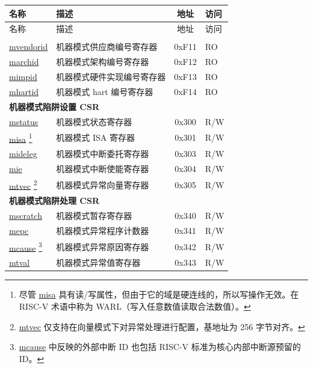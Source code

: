 
\begin{longtable}{ | p{4.0cm} | p{8.4cm} | c | l | }
\hline\rowcolor{lightgray}
名称 & 描述 & 地址 & 访问 \\ \hline
\endfirsthead
\hline
\rowcolor{lightgray}
名称 & 描述 & 地址 & 访问 \\
\hline
\endhead
\endfoot

\multicolumn{4}{|l|}{\textbf{机器模式信息 CSR}} \\\hline
\hyperref[regdesc:MVENDORID]{mvendorid} & 机器模式供应商编号寄存器 & 0xF11 & RO \\\hline
\hyperref[regdesc:MARCHID]{marchid} & 机器模式架构编号寄存器 & 0xF12 & RO \\\hline
\hyperref[regdesc:MIMPID]{mimpid} & 机器模式硬件实现编号寄存器 & 0xF13 & RO \\\hline
\hyperref[regdesc:MHARTID]{mhartid} & 机器模式 hart 编号寄存器 & 0xF14 & RO \\\hline
\multicolumn{4}{|l|}{\textbf{机器模式陷阱设置 CSR}} \\\hline
\hyperref[regdesc:MSTATUS]{mstatus} & 机器模式状态寄存器 & 0x300 & R/W \\\hline
\hyperref[regdesc:MISA]{misa} \footnote{尽管 \hyperref[regdesc:MISA]{misa} 具有读/写属性，但由于它的域是硬连线的，所以写操作无效。在 RISC-V 术语中称为 WARL（写入任意数值读取合法数值）。} & 机器模式 ISA 寄存器 & 0x301 & R/W \\\hline
\hyperref[regdesc:MIDELEG]{mideleg} & 机器模式中断委托寄存器 & 0x303 & R/W \\\hline
\hyperref[regdesc:MIE]{mie} & 机器模式中断使能寄存器 & 0x304 & R/W \\\hline
\hyperref[regdesc:MTVEC]{mtvec} \footnote{\hyperref[regdesc:MTVEC]{mtvec} 仅支持在向量模式下对异常处理进行配置，基地址为 256 字节对齐。} & 机器模式异常向量寄存器 & 0x305 & R/W \\\hline
\multicolumn{4}{|l|}{\textbf{机器模式陷阱处理 CSR}} \\\hline
\hyperref[regdesc:MSCRATCH]{mscratch} & 机器模式暂存寄存器 & 0x340 & R/W \\\hline
\hyperref[regdesc:MEPC]{mepc} & 机器模式异常程序计数器 & 0x341 & R/W \\\hline
\hyperref[regdesc:MCAUSE]{mcause} \footnote{\hyperref[regdesc:MCAUSE]{mcause} 中反映的外部中断 ID 也包括 RISC-V 标准为核心内部中断源预留的 ID。} & 机器模式异常原因寄存器 & 0x342 & R/W \\\hline
\hyperref[regdesc:MTVAL]{mtval} & 机器模式异常值寄存器 & 0x343 & R/W \\\hline

\end{longtable}
